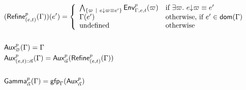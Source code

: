 \documentclass[a4paper]{article}
\theoremstyle{definition}
\begin{document}
    \begin{align*}
      &(\textsf{Refine}^{p}_{(e,t)}(\Gamma))(e') = 
        \left\{\begin{array}{ll}
          \bigwedge_{\{\varpi ~|~ e{\downarrow}\varpi \equiv e'\}} \textsf{Env}^{p}_{\Gamma,e,t} (\varpi) & \text{if } \exists \varpi.\ e{\downarrow}\varpi \equiv e' \\
          \Gamma(e') & \text{otherwise, if } e' \in \textsf{dom}(\Gamma)\\
          \text{undefined} & \text{otherwise}
        \end{array}\right.\\&\\
      &\textsf{Aux}^{p}_{\varnothing}(\Gamma) = \Gamma\\
      &\textsf{Aux}^{p}_{{(e,t)}\textsf{::}{\vec \alpha}}(\Gamma) = \textsf{Aux}^{p}_{\vec \alpha}(\textsf{Refine}^{p}_{(e,t)}(\Gamma))\\&\\
      &\textsf{Gamma}^{p}_{\vec \alpha}(\Gamma)=\textsf{gfp}_\Gamma (\textsf{Aux}^{p}_{\vec \alpha})
    \end{align*}
\end{document}
